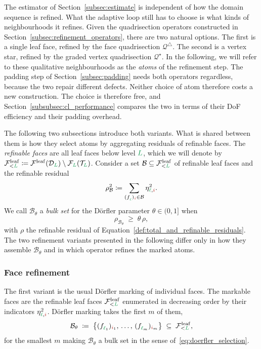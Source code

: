 \documentclass[a4paper, 12pt]{article}
\makeatletter
\newcommand{\quadriF}{\mathcal{Q}^{\triangle}}                   %
\newcommand{\quadriV}{\mathcal{Q}^{\star}}                       %
\newcommand{\quadriVup}[1]{\quadriV_{\rightarrow #1}}            %
\newcommand{\green}{\color{ForestGreen}}
\newcommand{\brickred}{\color{BrickRed}}
\newcommand{\T}{\mathcal{T}}
\newcommand{\F}{\mathcal{F}}
\newcommand{\face}[2]{\freeQ{f}{}{#1}{#2}}
\newcommand{\coarseIdxone}{{\brickred i}}
\renewcommand{\l}{{\green\ell}}
\renewcommand{\L}{{\green L}}
\newcommand{\B}{\mathcal{B}}
\newcommand{\freeQ}[4]{ ( {#1}^{#2}_{#3} )_{#4}}
\theoremstyle{definition}
\theoremstyle{plain}
\numberwithin{equation}{section}
\newcommand{\tobecut}[1]{{\color{red} #1}}     %
\DeclareRobustCommand{\domseq}[1][]{\mathcal{D}\ifx\@empty#1\@empty\else_{#1}\fi}
\newcommand{\leafF}[1]{\F^{\mathrm{leaf}}_{#1}}             %
\newcommand{\leafMesh}{\F^{\mathrm{leaf}}}                  %
\makeatother
\begin{document}
The estimator of Section~\ref{subsec:estimate} is independent of how the domain sequence is refined. What the adaptive loop still has to choose is what kinds of neighbourhoods it refines. Given the quadrisection operators constructed in Section~\ref{subsec:refinement_operators}, there are two natural options. The first is a single leaf face, refined by the face quadrisection $\quadriF$. The second is a vertex star, refined by the graded vertex quadrisection $\quadriV$. In the following, we will refer to these qualitative neighbourhoods as the \emph{atoms} of the refinement step. The padding step of Section~\ref{subsec:padding} needs both operators regardless, because the two repair different defects. Neither choice of atom therefore costs a new construction. The choice is therefore free, and Section~\ref{subsubsec:cl_performance} compares the two in terms of their DoF efficiency and their padding overhead.

\newcommand{\refinableFaces}{\leafF{<\L}}
The following two subsections introduce both variants. What is shared between them is how they select atoms by aggregating residuals of refinable faces. The \emph{refinable faces} are all leaf faces below level $\L$, which we will denote by $\leafF{<\L} \coloneq \leafMesh(\domseq[\L]) \setminus \F_\L(\T_\L)$. Consider a set $\B \subseteq \refinableFaces$ of refinable leaf faces and the refinable residual 
\begin{equation}
    \rho^2_{\B} \coloneq \sum\limits_{\face{\l}{\coarseIdxone} \in \B} \eta^2_{\l, \coarseIdxone}.
\end{equation}
We call $\B_\theta$ a \emph{bulk set} for the D\"orfler parameter $\theta \in (0,1]$ when
\begin{equation}
    \label{eq:doerfler_selection}
    \rho_{\B_\theta} \; \geq \; \theta \, \rho ,
\end{equation}
with $\rho$ the refinable residual of Equation~\eqref{def:total_and_refinable_residuals}. The two refinement variants presented in the following differ only in how they assemble $\B_\theta$ and in which operator refines the marked atoms.

\subsubsection{Face refinement}
\label{subsubsec:refine_face}

The first variant is the usual D\"orfler marking of individual faces. The markable faces are the refinable leaf faces $\refinableFaces$ enumerated in decreasing order by their indicators $\eta^2_{\l,\coarseIdxone}$. Dörfler marking takes the first $m$ of them,
\begin{equation}
    \label{eq:marked_faces}
    \B_\theta \; \coloneq \; \big\{ \face{\l_1}{\coarseIdxone_1}, \, \dots, \, \face{\l_m}{\coarseIdxone_m} \big\} \; \subseteq \; \refinableFaces ,
\end{equation}
for the smallest $m$ making $\B_\theta$ a bulk set in the sense of~\eqref{eq:doerfler_selection}.
\end{document}

